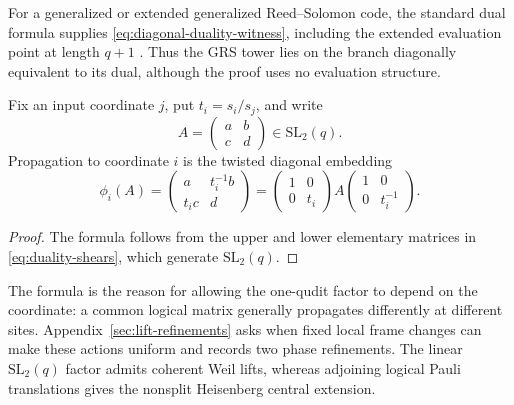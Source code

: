 \AMEFigureThree

For a generalized or extended generalized Reed--Solomon code, the
standard dual formula supplies \eqref{eq:diagonal-duality-witness}, including the extended
evaluation point at length \(q+1\)
\cite[Sections~5.2--5.3]{HuffmanPless2003}.  Thus the GRS tower lies on the
branch diagonally equivalent to its dual, although the proof uses no
evaluation structure.

\begin{proposition}
\label{prop:site-dependent-realization}
Fix an input coordinate \(j\), put \(t_i=s_i/s_j\), and write
\[
 A=\begin{pmatrix}a&b\\c&d\end{pmatrix}\in\mathrm{SL}_2(q).
\]
Propagation to coordinate \(i\) is the twisted diagonal embedding
\begin{equation}\label{eq:site-propagation}
 \phi_i(A)=
 \begin{pmatrix}a&t_i^{-1}b\\t_i c&d\end{pmatrix}
 =
 \begin{pmatrix}1&0\\0&t_i\end{pmatrix}
 A
 \begin{pmatrix}1&0\\0&t_i^{-1}\end{pmatrix}.
\end{equation}
\end{proposition}

\begin{proof}
The formula follows from the upper and lower elementary matrices in
\eqref{eq:duality-shears}, which generate \(\mathrm{SL}_2(q)\).
\end{proof}

The formula is the reason for allowing the one-qudit factor to depend on the
coordinate: a common logical matrix generally propagates differently at
different sites.  Appendix~\ref{sec:lift-refinements} asks when fixed local
frame changes can make these actions uniform and records two phase
refinements.  The linear
\(\mathrm{SL}_2(q)\) factor admits coherent Weil lifts, whereas adjoining
logical Pauli translations gives the nonsplit Heisenberg central extension.
